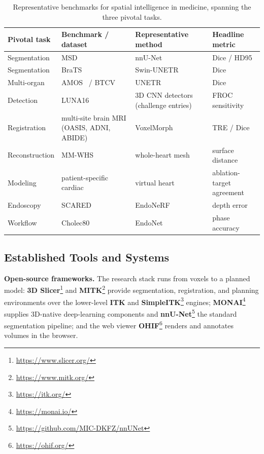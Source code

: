 \begin{table}[!th]
\centering
\fontsize{8}{10}\selectfont
\setlength{\tabcolsep}{1.0mm}
\caption{Representative benchmarks for spatial intelligence in medicine, spanning the three pivotal tasks.}
\label{tab:p4_s12_1_benchmarks}
\begin{tabular}{L{0.16\textwidth} L{0.28\textwidth} L{0.28\textwidth} L{0.20\textwidth}}
\toprule
\textbf{Pivotal task} & \textbf{Benchmark / dataset} & \textbf{Representative method} & \textbf{Headline metric} \\
\midrule
Segmentation & MSD~\cite{antonelli2022msd} & nnU-Net~\cite{isensee2021nnunet} & Dice / HD95 \\
Segmentation & BraTS~\cite{menze2015brats} & Swin-UNETR~\cite{hatamizadeh2022swinunetr} & Dice \\
Multi-organ & AMOS~\cite{ji2022amos} / BTCV~\cite{landman2015btcv} & UNETR~\cite{hatamizadeh2022unetr} & Dice \\
Detection & LUNA16~\cite{setio2017luna16} & 3D CNN detectors (challenge entries)~\cite{setio2017luna16} & FROC sensitivity \\
Registration & multi-site brain MRI (OASIS, ADNI, ABIDE) & VoxelMorph~\cite{balakrishnan2019voxelmorph} & TRE / Dice \\
Reconstruction & MM-WHS~\cite{zhuang2019mmwhs} & whole-heart mesh~\cite{kong2021meshdeformnet} & surface distance \\
Modeling & patient-specific cardiac & virtual heart~\cite{prakosa2018personalized} & ablation-target agreement \\
Endoscopy & SCARED~\cite{allan2021scared} & EndoNeRF~\cite{wang2022endonerf} & depth error \\
Workflow & Cholec80~\cite{twinanda2017endonet} & EndoNet~\cite{twinanda2017endonet} & phase accuracy \\
\bottomrule
\end{tabular}
\end{table}

\subsection{Established Tools and Systems}
\label{subsec:p4-sec12-1-established-tools-and-systems}

\textbf{Open-source frameworks.} The research stack runs from voxels to a planned model: \textbf{3D Slicer}\footnote{\url{https://www.slicer.org/}} and \textbf{MITK}\footnote{\url{https://www.mitk.org/}} provide segmentation, registration, and planning environments over the lower-level \textbf{ITK} and \textbf{SimpleITK}\footnote{\url{https://itk.org/}} engines; \textbf{MONAI}\footnote{\url{https://monai.io/}} supplies 3D-native deep-learning components and \textbf{nnU-Net}\footnote{\url{https://github.com/MIC-DKFZ/nnUNet}} the standard segmentation pipeline; and the web viewer \textbf{OHIF}\footnote{\url{https://ohif.org/}} renders and annotates volumes in the browser.

